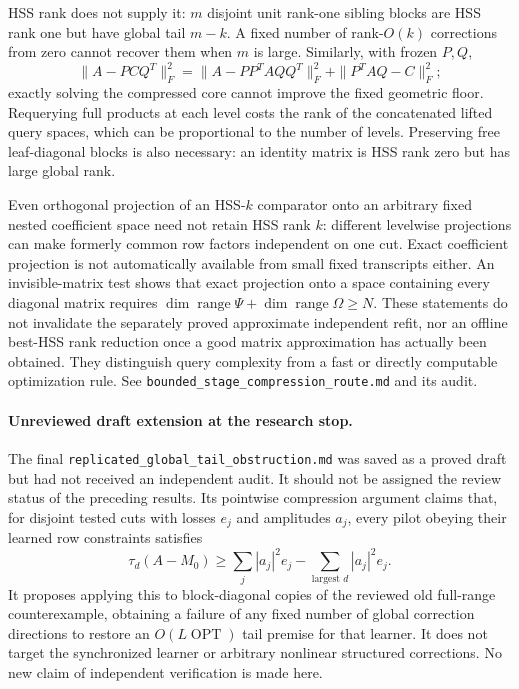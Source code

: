 \documentclass[11pt,oneside,openany,a4paper]{book}
\numberwithin{equation}{chapter}
\theoremstyle{definition}
\theoremstyle{remark}
\newcommand{\sourcefile}[1]{{\small\nolinkurl{#1}}}
\begin{document}
HSS rank does not supply it: $m$ disjoint unit rank-one sibling blocks
are HSS rank one but have global tail $m-k$.  A fixed number of
rank-$O(k)$ corrections from zero cannot recover them when $m$ is
large.  Similarly, with frozen $P,Q$,
\[
 \|A-PCQ^T\|_F^2
 =\|A-PP^TAQQ^T\|_F^2+\|P^TAQ-C\|_F^2;
\]
exactly solving the compressed core cannot improve the fixed geometric
floor.  Requerying full products at each level costs the rank of the
concatenated lifted query spaces, which can be proportional to the
number of levels.  Preserving free leaf-diagonal blocks is also
necessary: an identity matrix is HSS rank zero but has large global
rank.

Even orthogonal projection of an HSS-$k$ comparator onto an arbitrary
fixed nested coefficient space need not retain HSS rank $k$: different
levelwise projections can make formerly common row factors independent
on one cut.  Exact coefficient projection is not automatically
available from small fixed transcripts either.  An invisible-matrix
test shows that exact projection onto a space containing every
diagonal matrix requires
$\dim\operatorname{range}\Psi+\dim\operatorname{range}\Omega\ge N$.
These statements do not invalidate the separately proved approximate
independent refit, nor an offline best-HSS rank reduction once a good
matrix approximation has actually been obtained.  They distinguish
query complexity from a fast or directly computable optimization rule.
See \sourcefile{bounded_stage_compression_route.md} and its audit.

\paragraph{Unreviewed draft extension at the research stop.}
The final \sourcefile{replicated_global_tail_obstruction.md} was saved
as a proved draft but had not received an independent audit.  It
should not be assigned the review status of the preceding results.
Its pointwise compression argument claims that, for disjoint tested
cuts with losses $e_j$ and amplitudes $a_j$, every pilot obeying their
learned row constraints satisfies
\[
 \tau_d(A-M_0)\ge
 \sum_j|a_j|^2e_j-\sum_{\text{largest }d}|a_j|^2e_j.
\]
It proposes applying this to block-diagonal copies of the reviewed old
full-range counterexample, obtaining a failure of any fixed number of
global correction directions to restore an $O(L\operatorname{OPT})$
tail premise for that learner.  It does not target the synchronized
learner or arbitrary nonlinear structured corrections.  No new claim
of independent verification is made here.
\end{document}

